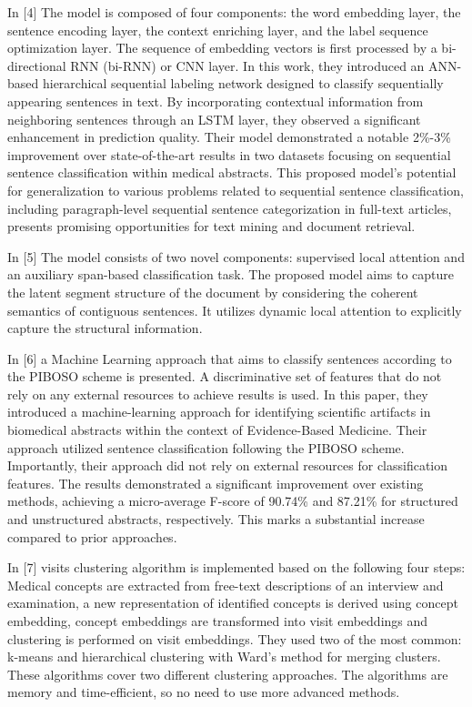 \documentclass[conference]{IEEEtran}
\begin{document}
In [4] The model is composed of four components: the word embedding layer, the sentence encoding layer, the context enriching layer, and the label sequence optimization layer. The sequence of embedding vectors is first processed by a bi-directional RNN (bi-RNN) or CNN layer. In this work, they introduced an ANN-based hierarchical sequential labeling network designed to classify sequentially appearing sentences in text. By incorporating contextual information from neighboring sentences through an LSTM layer, they observed a significant enhancement in prediction quality. Their model demonstrated a notable 2\%-3\% improvement over state-of-the-art results in two datasets focusing on sequential sentence classification within medical abstracts. This proposed model's potential for generalization to various problems related to sequential sentence classification, including paragraph-level sequential sentence categorization in full-text articles, presents promising opportunities for text mining and document retrieval.

In [5] The model consists of two novel components: supervised local attention and an auxiliary span-based classification task. The proposed model aims to capture the latent segment structure of the document by considering the coherent semantics of contiguous sentences. It utilizes dynamic local attention to explicitly capture the structural information. 

In [6] a Machine Learning approach that aims to classify sentences according to the PIBOSO scheme is presented. A discriminative set of features that do not rely on any external resources to achieve results is used. In this paper, they introduced a machine-learning approach for identifying scientific artifacts in biomedical abstracts within the context of Evidence-Based Medicine. Their approach utilized sentence classification following the PIBOSO scheme. Importantly, their approach did not rely on external resources for classification features. The results demonstrated a significant improvement over existing methods, achieving a micro-average F-score of 90.74\% and 87.21\% for structured and unstructured abstracts, respectively. This marks a substantial increase compared to prior approaches.

In [7] visits clustering algorithm is implemented based on the following four steps:  Medical concepts are extracted from free-text descriptions of an interview and examination, a new representation of identified concepts is derived using concept embedding, concept embeddings are transformed into visit embeddings and clustering is performed on visit embeddings. They used two of the most common: k-means and hierarchical clustering with Ward’s method for merging clusters.  These algorithms cover two different clustering approaches. The algorithms are memory and time-efficient, so no need to use more advanced methods. 
\end{document}
